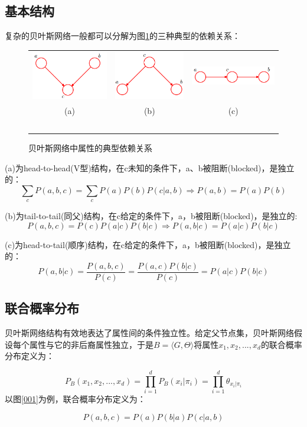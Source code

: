 \documentclass[11pt]{article}
\begin{document}
		\subsection{基本结构}
			复杂的贝叶斯网络一般都可以分解为图\ref{0-002}的三种典型的依赖关系：\par
			\begin{figure}
				\centering
				\begin{tabular}{ccc}
					\includegraphics[width=0.28\linewidth]{img/head2head.png} &
					\includegraphics[width=0.28\linewidth]{img/tail2tail.png} &
					\includegraphics[width=0.28\linewidth]{img/head2tail.png}\\
					(a) & (b) & (c) \\
					~\\
				\end{tabular}
				\caption{贝叶斯网络中属性的典型依赖关系}
				\label{0-002}
				\vspace{-0.5em}
			\end{figure}
			(a)为head-to-head(V型)结构，在c未知的条件下，a、b被阻断(blocked)，是独立的：
			$$\sum_{c}P(a,b,c)=\sum_{c}P(a)P(b)P(c|a,b)\Rightarrow P(a,b)=P(a)P(b)$$\par
			(b)为tail-to-tail(同父)结构，在c给定的条件下，a，b被阻断(blocked)，是独立的:
			$$P(a,b,c)=P(c)P(a|c)P(b|c)\Rightarrow P(a,b|c)=P(a|c)P(b|c)$$\par
			(c)为head-to-tail(顺序)结构，在c给定的条件下，a，b被阻断(blocked)，是独立的：
			$$P(a,b|c)=\frac{P(a,b,c)}{P(c)}=\frac{P(a,c)P(b|c)}{P(c)}=P(a|c)P(b|c)$$\par
			
		\subsection{联合概率分布}
			贝叶斯网络结构有效地表达了属性间的条件独立性。给定父节点集，贝叶斯网络假设每个属性与它的非后裔属性独立，于是$B=\langle G,\Theta\rangle$将属性$x_1, x_2, ..., x_d$的联合概率分布定义为：\par
			$$P_B(x_1,x_2,...,x_d)=\prod_{i=1}^{d}P_B(x_i|\pi_i)=\prod_{i=1}^{d}\theta_{x_i|\pi_i}$$
			以图\ref{001}为例，联合概率分布定义为：\par
			$$P(a,b,c)=P(a)P(b|a)P(c|a,b)$$
		
\end{document}
